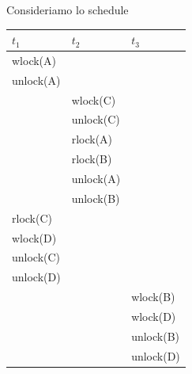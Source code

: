 Consideriamo lo schedule
\begin{center}
\begin{tabular}{|l|l|l|}
 \hline
 $t_1$ & $t_2$ & $t_3$\\
 \hline
 wlock(A)& &\\
 unlock(A)& &\\
 & wlock(C)& \\
 & unlock(C)& \\
 & rlock(A) & \\
 & rlock(B) &\\
  & unlock(A) &\\
  & unlock(B) &\\
 rlock(C) & &\\
 wlock(D) & &\\
 unlock(C)& & \\
 unlock(D)& & \\
 & & wlock(B)\\
 & & wlock(D)\\
 & & unlock(B)\\
 & & unlock(D)\\
\hline
 \end{tabular}
\end{center}



